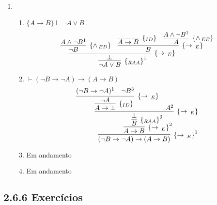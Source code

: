 \begin{enumerate}
	\item
	\begin{enumerate}
		\item $\{A \to B\}\vdash \neg A \lor B$
			\[
				\infer[\raa^1]
					{\neg A \lor B}
					{
						\infer[\impE]
							{\bot}
							{
								\infer[\andED]
									{\neg B}
									{A \land \neg B^1}
								&
								\infer[\impE]
									{B}
									{
										\infer[\Id]
											{A \to B}
											{}
										&
										\infer[\andEE]
											{A}
											{A \land \neg B^1}
									}	
							}	
					}		
			\]
		\item $\vdash (\neg B \to \neg A)\to (A \to B)$
			\[
				\infer[\impE^1]
					{(\neg B \to \neg A)\to (A \to B)}
					{
						\infer[\impE^2]
							{A \to B}
							{
								\infer[\raa^3]
									{B}
									{
										\infer[\impE]
											{\bot}
											{
												\infer[\Id]
													{A \to \bot}
													{
														\infer[\impE]
															{\neg A}
															{
																(\neg B \to \neg A)^1
																&
																\neg B^3	
															}
													}
												&
												A^2
											}
									}
							}
					}
			\]
		
		\item Em andamento
		\item Em andamento

	\end{enumerate}
	
\end{enumerate}

\subsection{2.6.6 Exerc\'icios}

